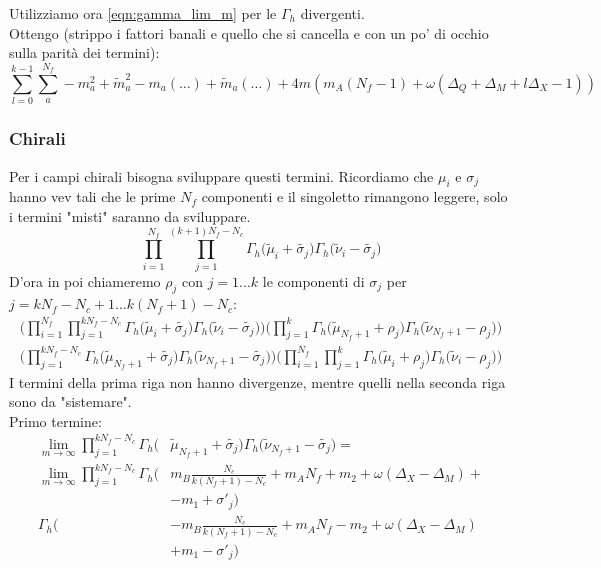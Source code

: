 \documentclass[a4paper,12pt]{article}
\begin{document}
Utilizziamo ora \ref{eqn:gamma_lim_m} per le $\Gamma_h$ divergenti.\\
Ottengo (strippo i fattori banali e quello che si cancella e con un po' di occhio sulla parità dei termini):
\begin{equation}
\sum_{l=0}^{k-1} \sum_a^{N_f}  - m_a^2 + \tilde{m}_a^2  -  m_a(\dots) + \tilde{m}_a(\dots) + 4  m ( m_A (N_f - 1)  + \omega( \Delta_Q +  \Delta_M + l\Delta_X  -1)  )
\label{eqn:contributo_mesoni}
\end{equation}

\subsubsection{Chirali}
Per i campi chirali bisogna sviluppare questi termini. Ricordiamo che $\mu_i$ e $\sigma_j$ hanno vev tali che le prime $N_f$ componenti e il singoletto rimangono leggere, solo i termini "misti" saranno da sviluppare.
\begin{equation}
\prod_{i=1}^{N_f} \prod_{j=1}^{(k+1)N_f - N_c } \Gamma_h \big( \tilde \mu_i + \tilde{\sigma_j} \big) \Gamma_h \big( \tilde \nu_i - \tilde{\sigma_j} \big)
\end{equation}
D'ora in poi chiameremo $\rho_j$ con $j= 1 \dots k$ le componenti di $\sigma_j$ per $ j = k N_f - N_c + 1 \dots k(N_f+1) -N_c$:
\begin{align*}
\bigg( \prod_{i=1}^{N_f} \prod_{j=1}^{k N_f - N_c } \Gamma_h \big( \tilde \mu_i + \tilde{\sigma_j} \big) \Gamma_h \big( \tilde \nu_i - \tilde{\sigma_j} \big) \bigg)
\bigg(\prod_{j=1}^{k} \Gamma_h \big( \tilde \mu_{N_f+1} + \rho_j \big) \Gamma_h \big( \tilde \nu_{N_f+1} - \rho_j \big) \bigg)\\
\bigg( \prod_{j=1}^{k N_f - N_c}   \Gamma_h \big( \tilde \mu_{N_f+1} + \tilde{\sigma_j} \big) \Gamma_h \big( \tilde \nu_{N_f+1} - \tilde{\sigma_j} \big) \bigg)
\bigg( \prod_{i=1}^{N_f} \prod_{j=1}^{k } \Gamma_h \big( \tilde \mu_i + \rho_j \big) \Gamma_h \big( \tilde \nu_i - \rho_j \big) \bigg)
\end{align*}
I termini della prima riga non hanno divergenze, mentre quelli nella seconda riga sono da "sistemare".\\
Primo termine:
\begin{align*}
\lim_{m \rightarrow \infty} \prod_{j=1}^{k N_f - N_c}   \Gamma_h \big(& \tilde \mu_{N_f+1} + \tilde{\sigma_j} \big) \Gamma_h \big( \tilde \nu_{N_f+1} - \tilde{\sigma_j} \big) =  \\
 \lim_{m \rightarrow \infty} \prod_{j=1}^{k N_f - N_c}   \Gamma_h \big(& m_B \frac{N_c}{k(N_f+1)-N_c } + m_A N_f + m_2 + \omega ( \Delta_X - \Delta_M) + \\
& - m_1   + \sigma'_j \big)
 \\
 \Gamma_h \big( &-  m_B \frac{N_c}{k(N_f+1)-N_c } + m_A N_f - m_2 + \omega ( \Delta_X - \Delta_M)  \\
&+ m_1  - \sigma'_j \big)
\end{align*}
\end{document}
